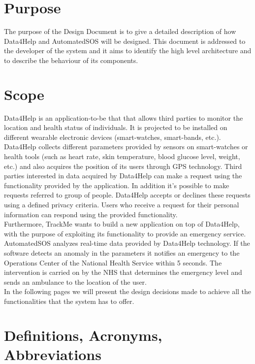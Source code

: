 \section{Purpose}
The purpose of the Design Document is to give a detailed description of how Data4Help and AutomatedSOS will be designed. This document is addressed to the developer of the system and it aims to identify the high level architecture and to describe the behaviour of its components.
\section{Scope}
Data4Help is an application-to-be that that allows third parties to monitor the location and health status of individuals. It is projected to be installed on different wearable electronic devices (smart-watches, smart-bands, etc.).
\newline Data4Help collects different parameters provided by sensors on smart-watches or health tools (such as heart rate, skin temperature, blood glucose level, weight, etc.) and also acquires the position of its users through GPS technology.
\newline Third parties interested in data acquired by Data4Help can make a request using the functionality provided by the application. In addition it's possible to make requests referred to group of people. Data4Help accepts or declines these requests using a defined privacy criteria.
Users who receive a request for their personal information can respond using the provided functionality.\\
Furthermore, TrackMe wants to build a new application on top of Data4Help, with the purpose of exploiting its functionality to provide an emergency service.
\newline AutomatedSOS analyzes real-time data provided by Data4Help technology.
If the software detects an anomaly in the parameters it notifies an emergency to the Operations Center of the National Health Service within 5 seconds. 
The intervention is carried on by the NHS that determines the emergency level and sends an ambulance to the location of the user.\\
In the following pages we will present the design decisions made to achieve all the functionalities that the system has to offer.


\section{Definitions, Acronyms, Abbreviations}
